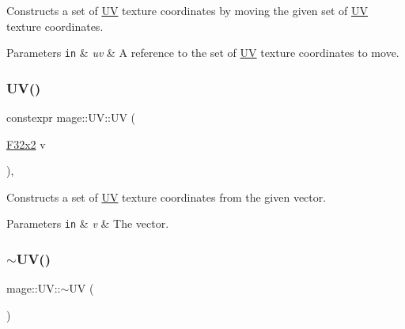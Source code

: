 Constructs a set of \mbox{\hyperlink{structmage_1_1_u_v}{UV}} texture coordinates by moving the given set of \mbox{\hyperlink{structmage_1_1_u_v}{UV}} texture coordinates.


\begin{DoxyParams}[1]{Parameters}
\mbox{\tt in}  & {\em uv} & A reference to the set of \mbox{\hyperlink{structmage_1_1_u_v}{UV}} texture coordinates to move. \\
\hline
\end{DoxyParams}
\mbox{\label{structmage_1_1_u_v_ab5b287a94fef45b70f7c6d50ede33bff}} 
\subsubsection{\texorpdfstring{U\+V()}{UV()}\hspace{0.1cm}{\footnotesize\ttfamily [5/5]}}
{\footnotesize\ttfamily constexpr mage\+::\+U\+V\+::\+UV (\begin{DoxyParamCaption}\item[{\mbox{\hyperlink{namespacemage_aee4759dedc8def6c6dec26b5c7eddf29}{F32x2}}}]{v }\end{DoxyParamCaption})\hspace{0.3cm}{\ttfamily [explicit]}, {\ttfamily [noexcept]}}

Constructs a set of \mbox{\hyperlink{structmage_1_1_u_v}{UV}} texture coordinates from the given vector.


\begin{DoxyParams}[1]{Parameters}
\mbox{\tt in}  & {\em v} & The vector. \\
\hline
\end{DoxyParams}
\mbox{\label{structmage_1_1_u_v_a9389be8cc9bb64861b69f79b44b6dd1b}} 
\subsubsection{\texorpdfstring{$\sim$\+U\+V()}{~UV()}}
{\footnotesize\ttfamily mage\+::\+U\+V\+::$\sim$\+UV (\begin{DoxyParamCaption}{ }\end{DoxyParamCaption})\hspace{0.3cm}{\ttfamily [default]}}

